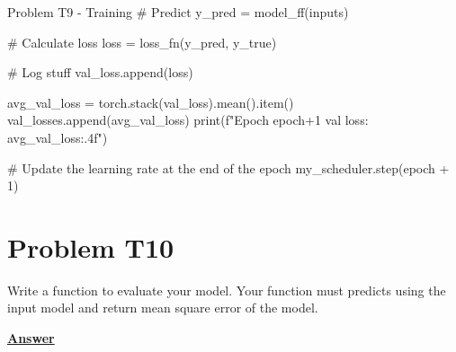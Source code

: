 \documentclass[12pt, a4paper]{article}
\begin{document}
\begin{codeblock}{Problem T9 - Training}
                                # Predict
                                y_pred = model_ff(inputs)

                                # Calculate loss
                                loss = loss_fn(y_pred, y_true)

                                # Log stuff
                                val_loss.append(loss)

                            avg_val_loss = torch.stack(val_loss).mean().item()
                            val_losses.append(avg_val_loss)
                            print(f"Epoch {epoch+1} val loss: {avg_val_loss:.4f}")

                        # Update the learning rate at the end of the epoch
                        my_scheduler.step(epoch + 1)
                \end{codeblock}

    \pagebreak

        \section{Problem T10}
            Write a function to evaluate your model.
            Your function must predicts using the input model
            and return mean square error of the model.

            \vspace{1em}

            \noindent \underline{\textbf{Answer}}

            \vspace{0.25em}
\end{document}
